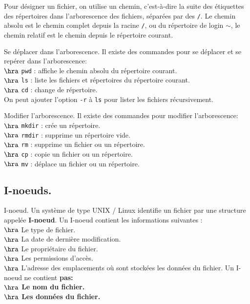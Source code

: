 \documentclass[french, 11pt]{article}
\begin{document}
\begin{defi}{}{}
    Pour désigner un fichier, on utilise un chemin, c'est-à-dire la suite des étiquettes des répertoires dans l'arborescence des fichiers, séparées par des \texttt{/}.\n
    Le chemin absolu est le chemin complet depuis la racine \texttt{/}, ou du répertoire de login $\sim$, le chemin relatif est le chemin depuis le répertoire courant.
\end{defi}

\begin{defi}{Se déplacer dans l'arborescence.}{}
   Il existe des commandes pour se déplacer et se repérer dans l'arborescence:\\
    $\hra$ \texttt{pwd} : affiche le chemin absolu du répertoire courant.\\
    $\hra$ \texttt{ls} : liste les fichiers et répertoires du répertoire courant.\\
    $\hra$ \texttt{cd} : change de répertoire.\\
    On peut ajouter l'option \texttt{-r} à \texttt{ls} pour lister les fichiers récursivement.
\end{defi}

\begin{defi}{Modifier l'arborescence.}{}
    Il existe des commandes pour modifier l'arborescence:\\
    $\hra$ \texttt{mkdir} : crée un répertoire.\\
    $\hra$ \texttt{rmdir} : supprime un répertoire vide.\\
    $\hra$ \texttt{rm} : supprime un fichier ou un répertoire.\\
    $\hra$ \texttt{cp} : copie un fichier ou un répertoire.\\
    $\hra$ \texttt{mv} : déplace un fichier ou un répertoire.
\end{defi}

\subsection{I-noeuds.}

\begin{defi}{I-noeud.}{}
    Un système de type UNIX / Linux identifie un fichier par une structure appelée \textbf{I-noeud}.\n
    Un I-noeud contient les informations suivantes :\\
    $\hra$ Le type de fichier.\\
    $\hra$ La date de dernière modification.\\
    $\hra$ Le propriétaire du fichier.\\
    $\hra$ Les permissions d'accès.\\
    $\hra$ L'adresse des emplacements où sont stockées les données du fichier.\n
    Un I-noeud ne contient \bf{pas}:\\
    $\hra$ Le nom du fichier.\\
    $\hra$ Les données du fichier.
\end{defi}
\end{document}
